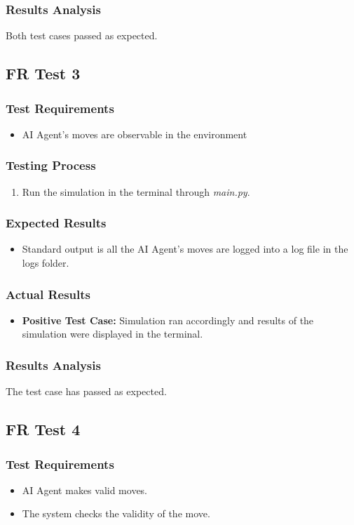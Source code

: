 \documentclass[12pt, titlepage]{article}
\providecommand{\DIFaddbegin}{} %
\providecommand{\DIFaddend}{} %
\begin{document}
\subsubsection{Results Analysis}
\item Both test cases passed as expected.

\subsection{FR Test 3}\DIFaddbegin \label{FRT3} 
\DIFaddend \subsubsection{Test Requirements}
\begin{itemize}
    \item AI Agent's moves are observable in the environment
\end{itemize}
\subsubsection{Testing Process}
\begin{enumerate}
    \item Run the simulation in the terminal through \textit{main.py}.
\end{enumerate}
\subsubsection{Expected Results}
\begin{itemize}
    \item Standard output is all the AI Agent's moves are logged into a log file in the logs folder.
\end{itemize}
\subsubsection{Actual Results}
\begin{itemize}
    \item \textbf{Positive Test Case:} Simulation ran accordingly and results of the simulation were displayed in the terminal.
\end{itemize}
\subsubsection{Results Analysis}
\item The test case has passed as expected.

\subsection{FR Test 4}\DIFaddbegin \label{FRT4} 
\DIFaddend \subsubsection{Test Requirements}
\begin{itemize}
    \item AI Agent makes valid moves.
    \item The system checks the validity of the move.
\end{itemize}
\end{document}
